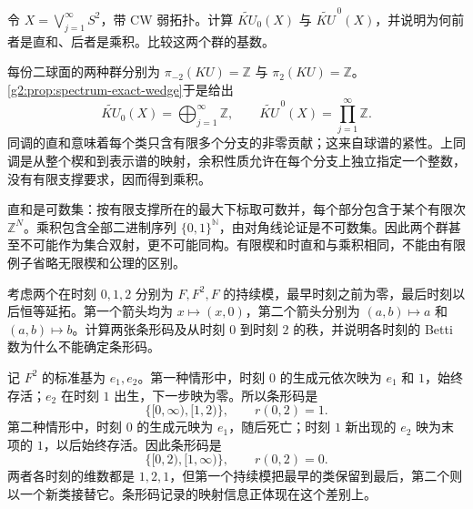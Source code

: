 \begin{exercise}\label{g2:ex:stable-wedge-direct-sum-product}
	令 \(X=\bigvee_{j=1}^{\infty}S^2\)，带 CW 弱拓扑。计算 \(\widetilde{KU}_0(X)\) 与 \(\widetilde{KU}^{\,0}(X)\)，并说明为何前者是直和、后者是乘积。比较这两个群的基数。
\end{exercise}
\begin{solution}
	每份二球面的两种群分别为 \(\pi_{-2}(KU)=\mathbb Z\) 与 \(\pi_2(KU)=\mathbb Z\)。\cref{g2:prop:spectrum-exact-wedge}于是给出
	\[
		\widetilde{KU}_0(X)=\bigoplus_{j=1}^{\infty}\mathbb Z,
		\qquad\widetilde{KU}^{\,0}(X)=\prod_{j=1}^{\infty}\mathbb Z.
	\]
	同调的直和意味着每个类只含有限多个分支的非零贡献；这来自球谱的紧性。上同调是从整个楔和到表示谱的映射，余积性质允许在每个分支上独立指定一个整数，没有有限支撑要求，因而得到乘积。

	直和是可数集：按有限支撑所在的最大下标取可数并，每个部分包含于某个有限次 \(\mathbb Z^N\)。乘积包含全部二进制序列 \(\{0,1\}^{\mathbb N}\)，由对角线论证是不可数集。因此两个群甚至不可能作为集合双射，更不可能同构。有限楔和时直和与乘积相同，不能由有限例子省略无限楔和公理的区别。
\end{solution}

\begin{exercise}\label{g2:ex:persistence-same-betti}
	考虑两个在时刻 \(0,1,2\) 分别为 \(F,F^2,F\) 的持续模，最早时刻之前为零，最后时刻以后恒等延拓。第一个箭头均为 \(x\mapsto(x,0)\)，第二个箭头分别为 \((a,b)\mapsto a\) 和 \((a,b)\mapsto b\)。计算两张条形码及从时刻 \(0\) 到时刻 \(2\) 的秩，并说明各时刻的 Betti 数为什么不能确定条形码。
\end{exercise}
\begin{solution}
	记 \(F^2\) 的标准基为 \(e_1,e_2\)。第一种情形中，时刻 \(0\) 的生成元依次映为 \(e_1\) 和 \(1\)，始终存活；\(e_2\) 在时刻 \(1\) 出生，下一步映为零。所以条形码是
	\[
		\{[0,\infty),[1,2)\},\qquad r(0,2)=1.
	\]
	第二种情形中，时刻 \(0\) 的生成元映为 \(e_1\)，随后死亡；时刻 \(1\) 新出现的 \(e_2\) 映为末项的 \(1\)，以后始终存活。因此条形码是
	\[
		\{[0,2),[1,\infty)\},\qquad r(0,2)=0.
	\]
	两者各时刻的维数都是 \(1,2,1\)，但第一个持续模把最早的类保留到最后，第二个则以一个新类接替它。条形码记录的映射信息正体现在这个差别上。
\end{solution}

